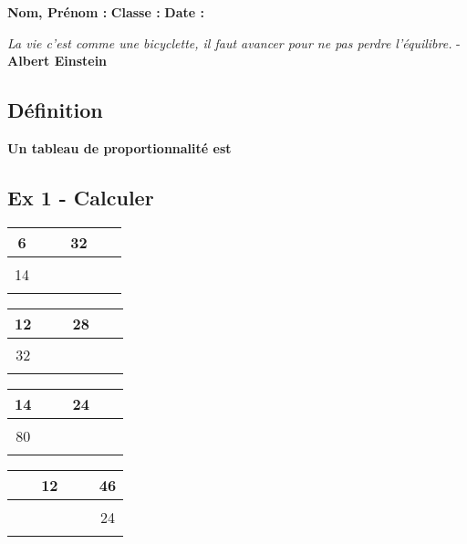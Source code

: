 



\textbf{Nom, Prénom :} \hspace{8cm} \textbf{Classe :} \hspace{3cm} \textbf{Date :}\\
\vspace{-0.8cm}
\begin{center}
  \textit{La vie c’est comme une bicyclette, il faut avancer pour ne pas perdre l’équilibre.} - \textbf{Albert Einstein}
\end{center}
\vspace{-0.8cm}

\subsection*{Définition}

\textbf{Un tableau de proportionnalité est}\dotfill \\ \Pointilles[3] 

\subsection*{Ex 1 - Calculer}


\begin{multicols}{4}\noindent
  \begin{center} \begin{tabular}{|c|c|}  \hline
      6    & 32\\  \hline
      14 & $\phantom{\dfrac{azertyuiop}{O}}$\\  \hline
    \end{tabular} \end{center}
  \Pointilles[2]
  \begin{center} \begin{tabular}{|c|c|}   \hline
      12  & 28\\  \hline
      32 & $\phantom{\dfrac{azertyuiop}{O}}$\\  \hline
    \end{tabular} \end{center}
  \Pointilles[2]
  \begin{center} \begin{tabular}{|c|c|}   \hline
      14  & 24\\  \hline
      80 & $\phantom{\dfrac{azertyuiop}{O}}$\\  \hline
    \end{tabular} \end{center}
  \Pointilles[2]
  \begin{center}\begin{tabular}{|c|c|}  \hline
      12 & 46\\  \hline
      $\phantom{\dfrac{azertyuiop}{O}}$ & 24\\  \hline
    \end{tabular} \end{center}

  \Pointilles[2]

\end{multicols}

